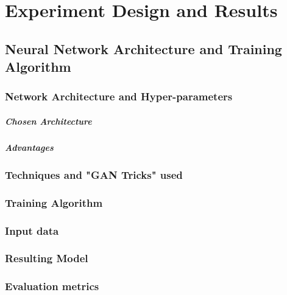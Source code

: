 \chapter{Experiment Design and Results}
\section{Neural Network Architecture and Training Algorithm}
\subsection{Network Architecture and Hyper-parameters}
\label{sec:networkarch}
\paragraph{Chosen Architecture}
 
\paragraph{Advantages} %
\label{sec:arch_advantages}

\subsection{Techniques and "GAN Tricks" used}
\subsection{Training Algorithm}

\subsection{Input data}
\label{sec:InputSelection}

\subsection{Resulting Model}
\subsection{Evaluation metrics}
\label{sec:evaluation}
